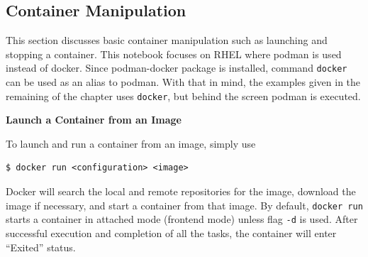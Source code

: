 \subsection{Container Manipulation}

This section discusses basic container manipulation such as launching and stopping a container. This notebook focuses on RHEL where podman is used instead of docker. Since podman-docker package is installed, command \verb|docker| can be used as an alias to podman. With that in mind, the examples given in the remaining of the chapter uses \verb|docker|, but behind the screen podman is executed.

\vspace{0.1in}
\noindent \textbf{Launch a Container from an Image}
\vspace{0.1in}

To launch and run a container from an image, simply use
\begin{lstlisting}
$ docker run <configuration> <image>
\end{lstlisting}
Docker will search the local and remote repositories for the image, download the image if necessary, and start a container from that image. By default, \verb|docker run| starts a container in attached mode (frontend mode) unless flag \verb|-d| is used. After successful execution and completion of all the tasks, the container will enter ``Exited'' status. 

